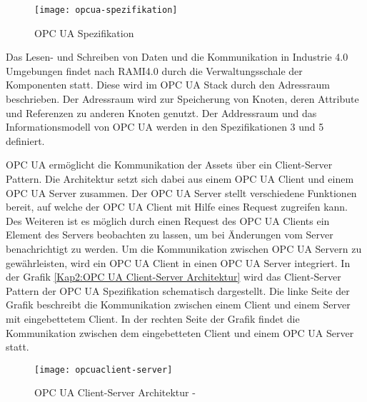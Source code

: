 \begin{figure}[h]
  \centering
  \texttt{[image: opcua-spezifikation]}
  \caption{OPC UA Spezifikation} 
  \label{Grundlagen:OPC UA Spezification}
\end{figure}

Das Lesen- und Schreiben von Daten und die Kommunikation in Industrie 4.0 Umgebungen findet nach \ac{RAMI4.0} durch die Verwaltungsschale der Komponenten statt. Diese wird im \ac{OPC UA} Stack durch den Adressraum beschrieben. Der Adressraum wird zur Speicherung von Knoten, deren Attribute und Referenzen zu anderen Knoten genutzt. Der Addressraum und das Informationsmodell von \ac{OPC UA} werden in den Spezifikationen 3 \cite{opcpt3} und 5 \cite{opcpt5} definiert.

\ac{OPC UA} ermöglicht die Kommunikation der Assets über ein Client-Server Pattern. Die Architektur setzt sich dabei aus einem \ac{OPC UA} Client und einem \ac{OPC UA} Server zusammen. Der \ac{OPC UA} Server stellt verschiedene Funktionen bereit, auf welche der \ac{OPC UA} Client mit Hilfe eines Request zugreifen kann. Des Weiteren ist es möglich durch einen Request des \ac{OPC UA} Clients ein Element des Servers beobachten zu lassen, um bei Änderungen vom Server benachrichtigt zu werden. Um die Kommunikation zwischen \ac{OPC UA} Servern zu gewährleisten, wird ein \ac{OPC UA} Client in einen \ac{OPC UA} Server integriert. In der Grafik \autoref{Kap2:OPC UA Client-Server Architektur} wird das Client-Server Pattern der \ac{OPC UA} Spezifikation schematisch dargestellt. Die linke Seite der Grafik beschreibt die Kommunikation zwischen einem Client und einem Server mit eingebettetem Client. In der rechten Seite der Grafik findet die Kommunikation zwischen dem eingebetteten Client und einem \ac{OPC UA} Server statt.

\begin{figure}[h]
  \centering
  \texttt{[image: opcuaclient-server]}
  \caption{OPC UA Client-Server Architektur - \cite{opcpt1}} 
  \label{Kap2:OPC UA Client-Server Architektur}
\end{figure}

